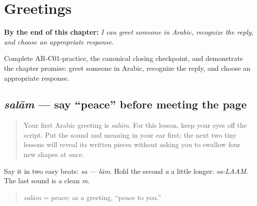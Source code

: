 
\chapter{Greetings}
\label{ch:greetings}

\begin{chapteropening}
\textbf{By the end of this chapter:} \emph{I can greet someone in Arabic, recognize the reply, and choose an appropriate response.}

Complete AR-C01-practice, the canonical closing checkpoint, and demonstrate the chapter promise: greet someone in Arabic, recognize the reply, and choose an appropriate response.
\end{chapteropening}

\section[\texorpdfstring{\ar{سلام} (salām)}{سلام (salām)}]{\emph{salām} — say “peace” before meeting the page}

\label{lesson:AR-C01-salam}



\begin{quote}
Your first Arabic greeting is \emph{salām}. For this lesson, keep your eyes off the script. Put the sound and meaning in your ear first; the next two tiny lessons will reveal its written pieces without asking you to swallow four new shapes at once.
\end{quote}

\begin{sounds}
Say it in two easy beats: \emph{sa} — \emph{lām}. Hold the second \emph{a} a little longer: \emph{sa-LAAM}. The last sound is a clean \emph{m}.

\begin{quote}
\emph{salām} = peace; as a greeting, “peace to you.”
\end{quote}
\end{sounds}

